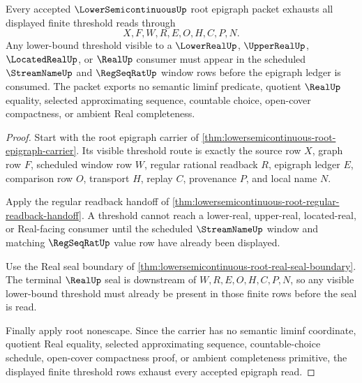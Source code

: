 \begin{theorem}
\label{thm:lowersemicontinuous-finite-epigraph-threshold-exhaustion}
Every accepted $\LowerSemicontinuousUp$ root epigraph packet exhausts all displayed finite threshold reads through
$$
X,F,W,R,E,O,H,C,P,N .
$$
Any lower-bound threshold visible to a $\LowerRealUp$, $\UpperRealUp$, $\LocatedRealUp$, or $\RealUp$ consumer must appear in the scheduled $\StreamNameUp$ and $\RegSeqRatUp$ window rows before the epigraph ledger is consumed. The packet exports no semantic liminf predicate, quotient $\RealUp$ equality, selected approximating sequence, countable choice, open-cover compactness, or ambient Real completeness.
\end{theorem}
\begin{proof}
Start with the root epigraph carrier of \autoref{thm:lowersemicontinuous-root-epigraph-carrier}. Its visible threshold route is exactly the source row $X$, graph row $F$, scheduled window row $W$, regular rational readback $R$, epigraph ledger $E$, comparison row $O$, transport $H$, replay $C$, provenance $P$, and local name $N$.

Apply the regular readback handoff of \autoref{thm:lowersemicontinuous-root-regular-readback-handoff}. A threshold cannot reach a lower-real, upper-real, located-real, or Real-facing consumer until the scheduled $\StreamNameUp$ window and matching $\RegSeqRatUp$ value row have already been displayed.

Use the Real seal boundary of \autoref{thm:lowersemicontinuous-root-real-seal-boundary}. The terminal $\RealUp$ seal is downstream of $W,R,E,O,H,C,P,N$, so any visible lower-bound threshold must already be present in those finite rows before the seal is read.

Finally apply root nonescape. Since the carrier has no semantic liminf coordinate, quotient Real equality, selected approximating sequence, countable-choice schedule, open-cover compactness proof, or ambient completeness primitive, the displayed finite threshold rows exhaust every accepted epigraph read.
\end{proof}

